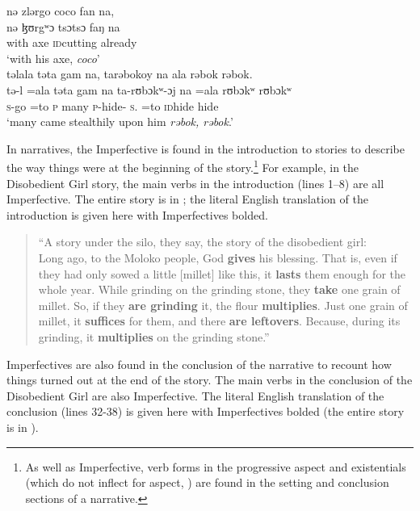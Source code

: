       \medskip
nə zlərgo coco  fan  na, \\      
\gll  nə ɮʊrgʷɔ tsɔtsɔ faŋ na \\    
      with    axe  \textsc{id}cutting    already   {\PSP}\\
\glt ‘with his axe, \textit{coco}’\\

\medskip
təlala  təta  gam  na,  tarəbokoy  na  ala rəbok rəbok.\\
\gll tə-l =ala təta gam na ta-rʊbɔkʷ{}-ɔj na =ala {rʊbɔkʷ rʊbɔkʷ}\\
     \textsc{s}-go =to  \textsc{p}  many  {\PSP}  \textsc{p}-hide-{\CL}     \textsc{s}.{\DO}  =to    {\textsc{id}hide hide}\\
\glt  ‘many came stealthily upon him \textit{rəbok, rəbok}.’ 
\z 

In narratives, the Imperfective is found in the introduction to stories to describe the way things were at the beginning of the story.\footnote{As well as Imperfective, verb forms in the progressive aspect  and existentials (which do not inflect for aspect, ) are found in the setting and conclusion sections of a narrative.} For example, in the Disobedient Girl story, the main verbs in the introduction (lines 1--8) are all Imperfective. The entire story is in ; the literal English translation of the introduction is given here with Imperfectives bolded. 

\begin{quote}{“A story under the silo, they say, the story of the disobedient girl: \\ Long ago, to the Moloko people, God \textbf{gives} his blessing. That is, even if they had only sowed a little [millet] like this, it \textbf{lasts} them enough for the whole year. While grinding on the grinding stone, they \textbf{take} one grain of millet. So, if they \textbf{are grinding} it, the flour \textbf{multiplies}. Just one grain of millet, it \textbf{suffices} for them, and there \textbf{are leftovers}. Because, during its grinding, it \textbf{multiplies} on the grinding stone.”}\end{quote}

Imperfectives are also found in the conclusion of the narrative to recount how things turned out at the end of the story. The main verbs in the conclusion of the Disobedient Girl are also Imperfective. The literal English translation of the conclusion (lines 32-38) is given here with Imperfectives bolded (the entire story is in ).

